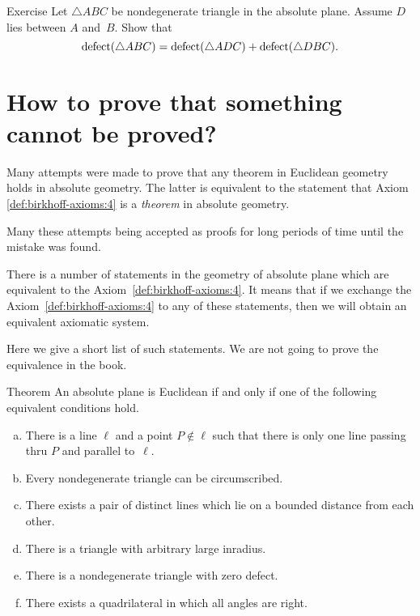 \begin{thm}{Exercise}\label{ex:defect}
Let $\triangle ABC$ be nondegenerate triangle in the absolute plane.
Assume $D$ lies between $A$ and~$B$.
Show that 
$$\mathop{\rm defect}\nolimits(\triangle ABC)=\mathop{\rm defect}\nolimits(\triangle ADC)+\mathop{\rm defect}\nolimits(\triangle DBC).$$

\end{thm}



\section*{How to prove that something\\ 
cannot be proved?}

Many attempts were made to prove that any theorem in Euclidean geometry holds in absolute geometry.
The latter is equivalent to the statement that Axiom \ref{def:birkhoff-axioms:4} is a {}\emph{theorem} in absolute geometry.

Many these attempts being accepted as proofs for long periods of time until the mistake was found.

There is a number of statements in the geometry of absolute plane which are equivalent to the Axiom~\ref{def:birkhoff-axioms:4}.
It means that if we exchange the Axiom~\ref{def:birkhoff-axioms:4}  to any of these statements, 
then we will obtain an equivalent axiomatic system.

Here we give a short list of such statements.
We are not going to prove the equivalence in the book.

\begin{thm}{Theorem}\label{thm:=IV}
An absolute plane is Euclidean if and only if one of the following equivalent conditions hold.
\begin{enumerate}[(a)]
\item\label{thm:=IV:main} 
There is a line $\ell$ 
and a point $P\notin\ell$ 
such that there is only one line passing thru $P$ 
and parallel to~$\ell$.
\item 
Every nondegenerate triangle can be circumscribed.
\item
There exists a pair of distinct lines which lie on a bounded distance from each other.
\item
There is a triangle with arbitrary large inradius.
\item
There is a nondegenerate triangle with zero defect.
\item
There exists a quadrilateral in which all angles are right.
\end{enumerate}
\end{thm}

